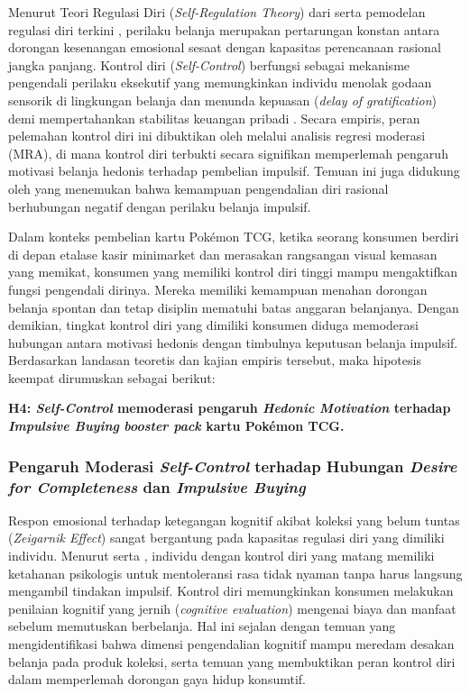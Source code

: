 \documentclass[12pt,a4paper]{article}
\numberwithin{equation}{section}
\numberwithin{table}{section}
\numberwithin{figure}{section}
\begin{document}
Menurut Teori Regulasi Diri (\emph{Self-Regulation Theory}) dari \citet{baumeister2002yield} serta pemodelan regulasi diri terkini \citep{baumeister2024selfcontrol}, perilaku belanja merupakan pertarungan konstan antara dorongan kesenangan emosional sesaat dengan kapasitas perencanaan rasional jangka panjang. Kontrol diri (\emph{Self-Control}) berfungsi sebagai mekanisme pengendali perilaku eksekutif yang memungkinkan individu menolak godaan sensorik di lingkungan belanja dan menunda kepuasan (\emph{delay of gratification}) demi mempertahankan stabilitas keuangan pribadi \citep{tangney2004high}. Secara empiris, peran pelemahan kontrol diri ini dibuktikan oleh \citet{lienardy2026role} melalui analisis regresi moderasi (MRA), di mana kontrol diri terbukti secara signifikan memperlemah pengaruh motivasi belanja hedonis terhadap pembelian impulsif. Temuan ini juga didukung oleh \citet{katauke2023financial} yang menemukan bahwa kemampuan pengendalian diri rasional berhubungan negatif dengan perilaku belanja impulsif.

Dalam konteks pembelian kartu Pok\'emon TCG, ketika seorang konsumen berdiri di depan etalase kasir minimarket dan merasakan rangsangan visual kemasan yang memikat, konsumen yang memiliki kontrol diri tinggi mampu mengaktifkan fungsi pengendali dirinya. Mereka memiliki kemampuan menahan dorongan belanja spontan dan tetap disiplin mematuhi batas anggaran belanjanya. Dengan demikian, tingkat kontrol diri yang dimiliki konsumen diduga memoderasi hubungan antara motivasi hedonis dengan timbulnya keputusan belanja impulsif. Berdasarkan landasan teoretis dan kajian empiris tersebut, maka hipotesis keempat dirumuskan sebagai berikut:

\vspace{0.2cm}
\textbf{H4: \emph{Self-Control} memoderasi pengaruh \emph{Hedonic Motivation} terhadap \emph{Impulsive Buying} \emph{booster pack} kartu Pok\'emon TCG.}

\subsubsection{Pengaruh Moderasi \emph{Self-Control} terhadap Hubungan \emph{Desire for Completeness} dan \emph{Impulsive Buying}}

Respon emosional terhadap ketegangan kognitif akibat koleksi yang belum tuntas (\emph{Zeigarnik Effect}) sangat bergantung pada kapasitas regulasi diri yang dimiliki individu. Menurut \citet{tangney2004high} serta \citet{baumeister2002yield}, individu dengan kontrol diri yang matang memiliki ketahanan psikologis untuk mentoleransi rasa tidak nyaman tanpa harus langsung mengambil tindakan impulsif. Kontrol diri memungkinkan konsumen melakukan penilaian kognitif yang jernih (\emph{cognitive evaluation}) mengenai biaya dan manfaat sebelum memutuskan berbelanja. Hal ini sejalan dengan temuan \citet{artadita2024how} yang mengidentifikasi bahwa dimensi pengendalian kognitif mampu meredam desakan belanja pada produk koleksi, serta temuan \citet{apidana2022peran} yang membuktikan peran kontrol diri dalam memperlemah dorongan gaya hidup konsumtif.
\end{document}

